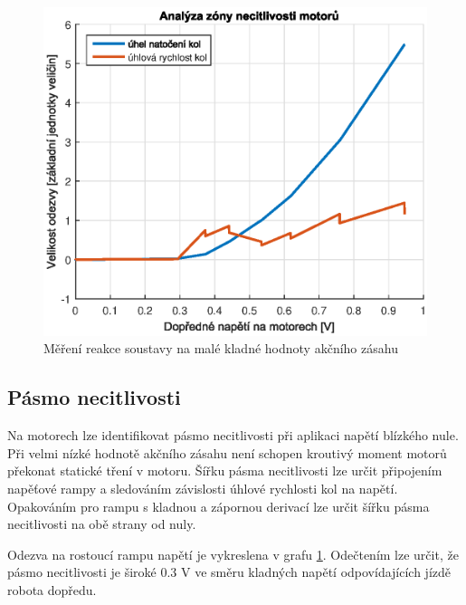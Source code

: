 \documentclass[conference]{IEEEtran}
\begin{document}
\begin{figure}[htbp]
    \centerline{\includegraphics[width=\linewidth]{deadzone_motory_vpred.eps}}
    \caption{Měření reakce soustavy na malé kladné hodnoty akčního zásahu}
    \label{fig:deadzone_vpred}        
\end{figure}

\subsection{Pásmo necitlivosti}
Na motorech lze identifikovat pásmo necitlivosti při aplikaci napětí blízkého nule. Při velmi nízké hodnotě
akčního zásahu není schopen kroutivý moment motorů překonat statické tření v motoru.
Šířku pásma necitlivosti lze určit připojením napěťové rampy a sledováním závislosti úhlové rychlosti kol na napětí.
Opakováním pro rampu s kladnou a zápornou derivací lze určit šířku pásma necitlivosti na obě strany od nuly.

Odezva na rostoucí rampu napětí je vykreslena v grafu \ref{fig:deadzone_vpred}. Odečtením lze určit,
že pásmo necitlivosti je široké 0.3 \si{V} ve směru kladných napětí odpovídajících jízdě robota dopředu. 
\end{document}
